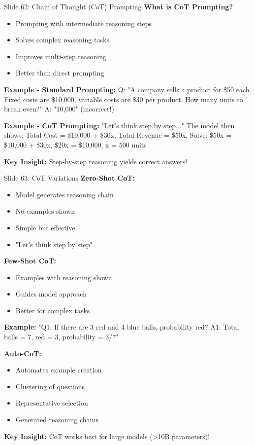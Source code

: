 \documentclass[8pt]{beamer}
\begin{document}
	\begin{frame}{Slide 62: Chain of Thought (CoT) Prompting}
		\fontsize{6.5}{7.5}\selectfont
		\textbf{What is CoT Prompting?}
		\begin{itemize}
			\item Prompting with intermediate reasoning steps
			\item Solves complex reasoning tasks
			\item Improves multi-step reasoning
			\item Better than direct prompting
		\end{itemize}
		
		\vspace{0.1cm}
		\textbf{Example - Standard Prompting:}
		Q: "A company sells a product for \$50 each. Fixed costs are \$10,000, variable costs are \$30 per product. How many units to break even?"
		A: "10,000" (incorrect!)
		
		\vspace{0.1cm}
		\textbf{Example - CoT Prompting:}
		"Let's think step by step..."
		The model then shows: Total Cost = \$10,000 + \$30x, Total Revenue = \$50x, Solve: \$50x = \$10,000 + \$30x, \$20x = \$10,000, x = 500 units
		
		\textcolor{myblue}{\textbf{Key Insight:}} Step-by-step reasoning yields correct answers!
	\end{frame}
	
	\begin{frame}{Slide 63: CoT Variations}
		\fontsize{6.5}{7.5}\selectfont
		\textbf{Zero-Shot CoT:}
		\begin{itemize}
			\item Model generates reasoning chain
			\item No examples shown
			\item Simple but effective
			\item "Let's think step by step"
		\end{itemize}
		
		\vspace{0.1cm}
		\textbf{Few-Shot CoT:}
		\begin{itemize}
			\item Examples with reasoning shown
			\item Guides model approach
			\item Better for complex tasks
		\end{itemize}
		\textbf{Example:}
		"Q1: If there are 3 red and 4 blue balls, probability red? A1: Total balls = 7, red = 3, probability = 3/7"
		
		\vspace{0.1cm}
		\textbf{Auto-CoT:}
		\begin{itemize}
			\item Automates example creation
			\item Clustering of questions
			\item Representative selection
			\item Generated reasoning chains
		\end{itemize}
		
		\textcolor{myblue}{\textbf{Key Insight:}} CoT works best for large models (>10B parameters)!
	\end{frame}
	
\end{document}

